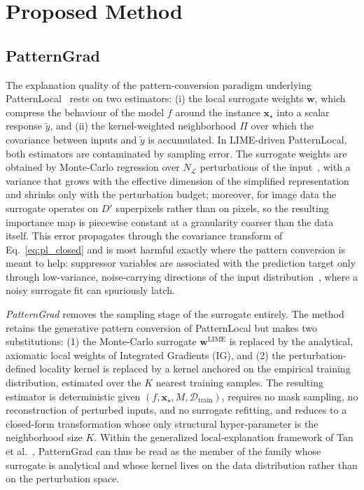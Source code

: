 \documentclass[pdflatex,sn-mathphys-num]{sn-jnl}
\theoremstyle{thmstyleone}
\theoremstyle{thmstyletwo}%
\theoremstyle{thmstylethree}%
\begin{document}
\section{Proposed Method}\label{sec4}

\subsection{PatternGrad}

The explanation quality of the pattern-conversion paradigm underlying PatternLocal~\cite{patternlocal_citation} rests on two estimators: (i) the local surrogate weights $\mathbf{w}$, which compress the behaviour of the model $f$ around the instance $\mathbf{x}_\star$ into a scalar response $\tilde{y}$, and (ii) the kernel-weighted neighborhood $\Pi$ over which the covariance between inputs and $\tilde{y}$ is accumulated. In LIME-driven PatternLocal, both estimators are contaminated by sampling error. The surrogate weights are obtained by Monte-Carlo regression over $N_{\mathcal{L}}$ perturbations of the input~\cite{ribeiro2016,tan2023}, with a variance that grows with the effective dimension of the simplified representation and shrinks only with the perturbation budget; moreover, for image data the surrogate operates on $D'$ superpixels rather than on pixels, so the resulting importance map is piecewise constant at a granularity coarser than the data itself. This error propagates through the covariance transform of Eq.~\eqref{eq:pl_closed} and is most harmful exactly where the pattern conversion is meant to help: suppressor variables are associated with the prediction target only through low-variance, noise-carrying directions of the input distribution~\cite{haufe2014,wilming2022}, where a noisy surrogate fit can spuriously latch.

\emph{PatternGrad} removes the sampling stage of the surrogate entirely. The method retains the generative pattern conversion of PatternLocal but makes two substitutions: (1) the Monte-Carlo surrogate $\mathbf{w}^{\text{LIME}}$ is replaced by the analytical, axiomatic local weights of Integrated Gradients (IG), and (2) the perturbation-defined locality kernel is replaced by a kernel anchored on the empirical training distribution, estimated over the $K$ nearest training samples. The resulting estimator is deterministic given $(f, \mathbf{x}_\star, M, \mathcal{D}_{\text{train}})$, requires no mask sampling, no reconstruction of perturbed inputs, and no surrogate refitting, and reduces to a closed-form transformation whose only structural hyper-parameter is the neighborhood size $K$. Within the generalized local-explanation framework of Tan et al.~\cite{tan2023}, PatternGrad can thus be read as the member of the family whose surrogate is analytical and whose kernel lives on the data distribution rather than on the perturbation space.
\end{document}
